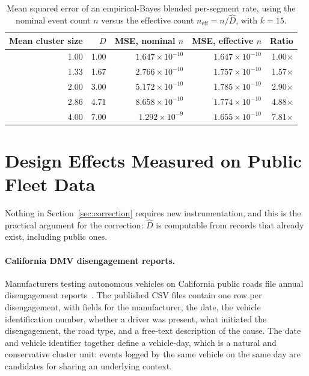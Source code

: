 \documentclass[11pt]{article}
\begin{document}
\begin{table}[htbp]
\centering
\caption{Mean squared error of an empirical-Bayes blended per-segment rate,
using the nominal event count $n$ versus the effective count
$n_{\text{eff}} = n/\hat{D}$, with $k = 15$.}
\label{tab:shrinkage}
\begin{tabular}{rrrrr}
\toprule
Mean cluster size & $D$ & MSE, nominal $n$ & MSE, effective $n$ & Ratio \\
\midrule
1.00 & 1.00 & $1.647 \times 10^{-10}$ & $1.647 \times 10^{-10}$ & 1.00$\times$ \\
1.33 & 1.67 & $2.766 \times 10^{-10}$ & $1.757 \times 10^{-10}$ & 1.57$\times$ \\
2.00 & 3.00 & $5.172 \times 10^{-10}$ & $1.785 \times 10^{-10}$ & 2.90$\times$ \\
2.86 & 4.71 & $8.658 \times 10^{-10}$ & $1.774 \times 10^{-10}$ & 4.88$\times$ \\
4.00 & 7.00 & $1.292 \times 10^{-9}$  & $1.655 \times 10^{-10}$ & 7.81$\times$ \\
\bottomrule
\end{tabular}
\end{table}

\section{Design Effects Measured on Public Fleet Data}
\label{sec:practice}

Nothing in Section~\ref{sec:correction} requires new instrumentation, and this is
the practical argument for the correction: $\hat{D}$ is computable from records
that already exist, including public ones.

\paragraph{California DMV disengagement reports.} Manufacturers testing autonomous
vehicles on California public roads file annual disengagement
reports~\cite{cadmv_disengagement}. The published CSV files contain one row per
disengagement, with fields for the manufacturer, the date, the vehicle
identification number, whether a driver was present, what initiated the
disengagement, the road type, and a free-text description of the cause. The date
and vehicle identifier together define a vehicle-day, which is a natural and
conservative cluster unit: events logged by the same vehicle on the same day are
candidates for sharing an underlying context.
\end{document}
